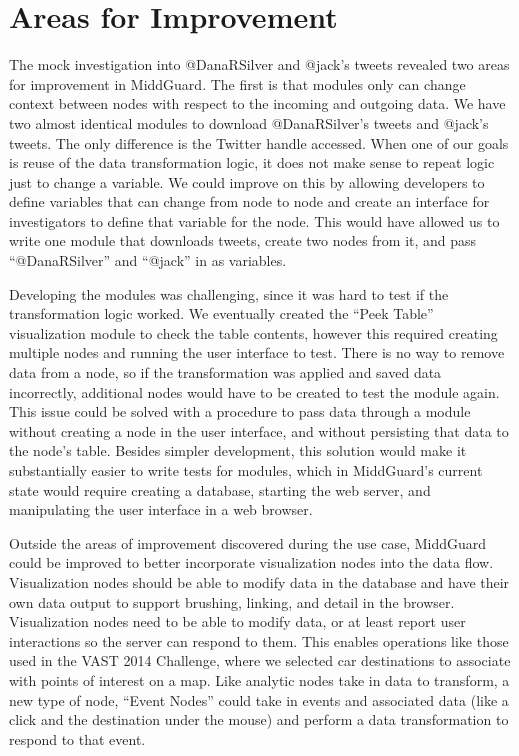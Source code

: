 \documentclass[midd]{thesis}
\begin{document}
\section{Areas for Improvement}

The mock investigation into @DanaRSilver and @jack's tweets revealed two areas
for improvement in MiddGuard. The first is that modules only can change context
between nodes with respect to the incoming and outgoing data. We have two
almost identical modules to download @DanaRSilver's tweets and @jack's tweets.
The only difference is the Twitter handle accessed. When one of our goals is
reuse of the data transformation logic, it does not make sense to repeat logic
just to change a variable. We could improve on this by allowing developers to
define variables that can change from node to node and create an interface for
investigators to define that variable for the node. This would have allowed us
to write one module that downloads tweets, create two nodes from it, and pass
``@DanaRSilver'' and ``@jack'' in as variables.

Developing the modules was challenging, since it was hard to test if the
transformation logic worked. We eventually created the ``Peek Table''
visualization module to check the table contents, however this required creating
multiple nodes and running the user interface to test. There is no way to remove
data from a node, so if the transformation was applied and saved data
incorrectly, additional nodes would have to be created to test the module again.
This issue could be solved with a procedure to pass data through a module
without creating a node in the user interface, and without persisting that data
to the node's table. Besides simpler development, this solution would make it
substantially easier to write tests for modules, which in MiddGuard's current
state would require creating a database, starting the web server, and
manipulating the user interface in a web browser.

Outside the areas of improvement discovered during the use case, MiddGuard could
be improved to better incorporate visualization nodes into the data flow.
Visualization nodes should be able to modify data in the database and have their
own data output to support brushing, linking, and detail in the browser.
Visualization nodes need to be able to modify data, or at least report user
interactions so the server can respond to them. This enables operations like
those used in the VAST 2014 Challenge, where we selected car destinations to
associate with points of interest on a map. Like analytic nodes take in data to
transform, a new type of node, ``Event Nodes'' could take in events and
associated data (like a click and the destination under the mouse) and perform a
data transformation to respond to that event.
\end{document}
